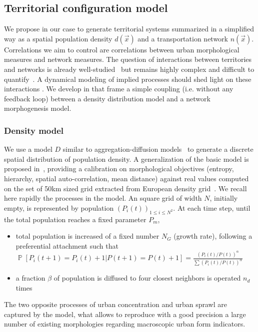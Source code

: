 \documentclass{article}
\DeclareMathOperator{\Proba}{\mathbb{P}}
\newcommand{\Pb}[1]{\ensuremath{\Proba\!\left[#1\right]}}
\begin{document}
\subsection*{Territorial configuration model}

We propose in our case to generate territorial systems summarized in a simplified way as a spatial population density $d(\vec{x})$ and a transportation network $n(\vec{x})$. Correlations we aim to control are correlations between urban morphological measures and network measures. The question of interactions between territories and networks is already well-studied~\cite{offner1996reseaux} but remains highly complex and difficult to quantify~\cite{offner1993effets}. A dynamical modeling of implied processes should shed light on these interactions \cite{bretagnolle:tel-00459720}. We develop in that frame a simple coupling (i.e. without any feedback loop) between a density distribution model and a network morphogenesis model.




\subsubsection*{Density model}

We use a model $D$ similar to aggregation-diffusion models~\cite{batty2006hierarchy} to generate a discrete spatial distribution of population density. A generalization of the basic model is proposed in~\cite{raimbault2018calibration}, providing a calibration on morphological objectives (entropy, hierarchy, spatial auto-correlation, mean distance) against real values computed on the set of 50km sized grid extracted from European density grid~\cite{eurostat}. We recall here rapidly the processes in the model. An square grid of width $N$, initially empty, is represented by population $(P_i(t))_{1\leq i\leq N^2}$. At each time step, until the total population reaches a fixed parameter $P_m$,
\begin{itemize}
\item total population is increased of a fixed number $N_G$ (growth rate), following a preferential attachment such that $\Pb{P_i(t+1)=P_i(t)+1|P(t+1)=P(t)+1}=\frac{(P_i(t)/P(t))^{\alpha}}{\sum(P_i(t)/P(t))^{\alpha}}$
\item a fraction $\beta$ of population is diffused to four closest neighbors is operated $n_d$ times
\end{itemize}


The two opposite processes of urban concentration and urban sprawl are captured by the model, what allows to reproduce with a good precision a large number of existing morphologies regarding macroscopic urban form indicators.
\end{document}
